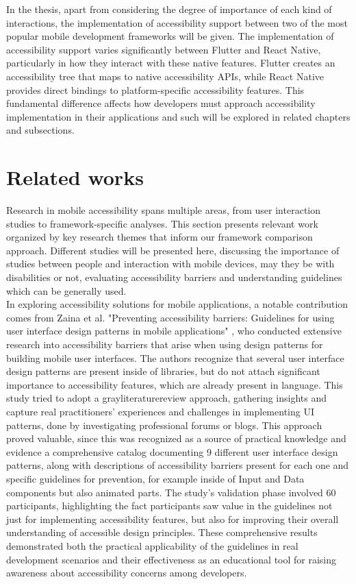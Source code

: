 In the thesis, apart from considering the degree of importance of each kind of interactions, the implementation of accessibility support between two of the most popular mobile development frameworks will be given. The implementation of accessibility support varies significantly between Flutter and React Native, particularly in how they interact with these native features. Flutter creates an accessibility tree that maps to native accessibility APIs, while React Native provides direct bindings to platform-specific accessibility features. This fundamental difference affects how developers must approach accessibility implementation in their applications and such will be explored in related chapters and subsections.

\section{Related works}
\label{chap:intro-related-works}

Research in mobile accessibility spans multiple areas, from user interaction studies to framework-specific analyses. This section presents relevant work organized by key research themes that inform our framework comparison approach. Different studies will be presented here, discussing the importance of studies between people and interaction with mobile devices, may they be with disabilities or not, evaluating accessibility barriers and understanding guidelines which can be generally used. \\

In exploring accessibility solutions for mobile applications, a notable contribution comes from Zaina et al. "Preventing accessibility barriers: Guidelines for using user interface design patterns in mobile applications" \cite{zaina2022preventing}, who conducted extensive research into accessibility barriers that arise when using design patterns for building mobile user interfaces. The authors recognize that several user interface design patterns are present inside of libraries, but do not attach significant importance to accessibility features, which are already present in language. This study tried to adopt a \gls{grayliteraturereview} approach, gathering insights and capture real practitioners' experiences and challenges in implementing UI patterns, done by investigating professional forums or blogs. This approach proved valuable, since this was recognized as a source of practical knowledge and evidence a comprehensive catalog documenting 9 different user interface design patterns, along with descriptions of accessibility barriers present for each one and specific guidelines for prevention, for example inside of Input and Data components but also animated parts. The study's validation phase involved 60 participants, highlighting the fact participants saw value in the guidelines not just for implementing accessibility features, but also for improving their overall understanding of accessible design principles. These comprehensive results demonstrated both the practical applicability of the guidelines in real development scenarios and their effectiveness as an educational tool for raising awareness about accessibility concerns among developers.\\


